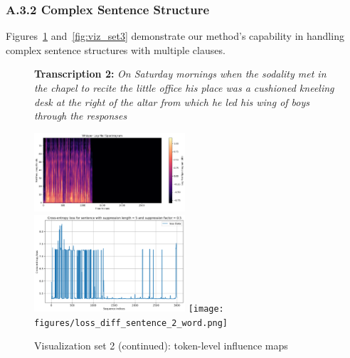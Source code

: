 \documentclass[../report.tex]{subfiles}
\begin{document}
    \subsubsection*{A.3.2 Complex Sentence Structure}
    Figures~\ref{fig:viz_set2} and~\ref{fig:viz_set3} demonstrate our method's capability in handling complex sentence structures with multiple clauses.
    \begin{figure}[p]
        \centering
        \begin{minipage}{0.95\textwidth}
        \raggedright
        \textbf{Transcription 2:} \textit{On Saturday mornings when the sodality met in the chapel to recite the little office his place was a cushioned kneeling desk at the right of the altar from which he led his wing of boys through the responses}
        \end{minipage}
        
        \includegraphics[width=0.5\textwidth]{figures/mel2.png}
        \includegraphics[width=0.5\textwidth]{figures/loss_diff_sentence_2_sentence.png}
        \texttt{[image: figures/loss\_diff\_sentence\_2\_word.png]}
        \caption{Visualization set 2 (continued): token-level influence maps}
        \label{fig:viz_set2}
    \end{figure}
\end{document}
